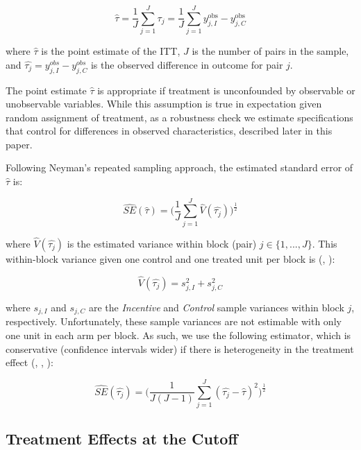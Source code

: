\documentclass[12pt]{article}
\begin{document}
\begin{equation} \label{itt_spec}
	\hat{\tau} = \frac{1}{J}\sum_{j=1}^{J} \hat{\tau_j} = \frac{1}{J}\sum_{j=1}^{J} y^\text{obs}_{j,I} - y^\text{obs}_{j,C}
\end{equation}

where $\hat{\tau}$ is the point estimate of the ITT, $J$ is the number of pairs in the sample, and $\hat{\tau_j} = y^{obs}_{j,I} - y^{obs}_{j,C}$ is the observed difference in outcome for pair $j$.

The point estimate $\hat{\tau}$ is appropriate if treatment is unconfounded by observable or unobservable variables. While this assumption is true in expectation given random assignment of treatment, as a robustness check we estimate specifications that control for differences in observed characteristics, described later in this paper.

Following Neyman's repeated sampling approach, the estimated standard error of $\hat{\tau}$ \citep{imai2008, ir2015, ai2017} is:

\begin{equation} \label{se_block}
	\hat{SE}(\hat{\tau}) = \Big(\frac{1}{J}\sum_{j=1}^{J} \hat{V}(\hat{\tau_j}) \Big)^\frac{1}{2}
\end{equation}

where $\hat{V}(\hat{\tau_j})$ is the estimated variance within block (pair) $j\in \{1,...,J\}$. This within-block variance given one control and one treated unit per block is (\cite{ir2015}, \cite{ai2017}):

\begin{equation} \label{v_block}
	\hat{V}(\hat{\tau_j}) = s_{j, I}^2 + s_{j, C}^2
\end{equation}

where $s_{j, I}$ and $s_{j, C}$ are the \textit{Incentive} and \textit{Control} sample variances within block $j$, respectively. Unfortunately, these sample variances are not estimable with only one unit in each arm per block. As such, we use the following estimator, which is conservative (confidence intervals wider) if there is heterogeneity in the treatment effect (\cite{imai2008}, \cite{ir2015}, \cite{ai2017}):

\begin{equation} \label{se_imai}
	\hat{SE}(\hat{\tau_j}) = \Big(\frac{1}{J(J-1)}\sum_{j=1}^{J} (\hat{\tau_j} - \hat{\tau})^2 \Big)^\frac{1}{2}
\end{equation}

\subsection{Treatment Effects at the Cutoff}
\end{document}
